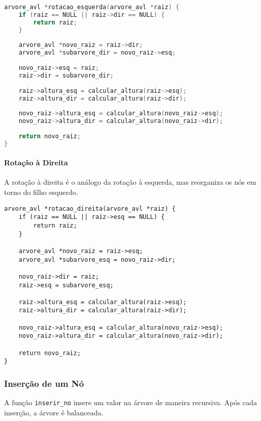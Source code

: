\begin{lstlisting}[language=C]
arvore_avl *rotacao_esquerda(arvore_avl *raiz) {
    if (raiz == NULL || raiz->dir == NULL) {
        return raiz;
    }
      
    arvore_avl *novo_raiz = raiz->dir;
    arvore_avl *subarvore_dir = novo_raiz->esq;
      
    novo_raiz->esq = raiz;
    raiz->dir = subarvore_dir;
      
    raiz->altura_esq = calcular_altura(raiz->esq);
    raiz->altura_dir = calcular_altura(raiz->dir);
      
    novo_raiz->altura_esq = calcular_altura(novo_raiz->esq);
    novo_raiz->altura_dir = calcular_altura(novo_raiz->dir);
      
    return novo_raiz;
}
\end{lstlisting}

\paragraph{Rotação à Direita}  
A rotação à direita é o análogo da rotação à esquerda, mas reorganiza os nós em torno do filho esquerdo.

\begin{lstlisting}[]
arvore_avl *rotacao_direita(arvore_avl *raiz) {
    if (raiz == NULL || raiz->esq == NULL) {
        return raiz;
    }
      
    arvore_avl *novo_raiz = raiz->esq;
    arvore_avl *subarvore_esq = novo_raiz->dir;
      
    novo_raiz->dir = raiz;
    raiz->esq = subarvore_esq;
      
    raiz->altura_esq = calcular_altura(raiz->esq);
    raiz->altura_dir = calcular_altura(raiz->dir);
      
    novo_raiz->altura_esq = calcular_altura(novo_raiz->esq);
    novo_raiz->altura_dir = calcular_altura(novo_raiz->dir);
      
    return novo_raiz;
}
\end{lstlisting}

\vspace{3mm}

\subsubsection{Inserção de um Nó}

\vspace{3mm}

A função \texttt{inserir\_no} insere um valor na árvore de maneira recursiva. Após cada inserção, a árvore é balanceada.

